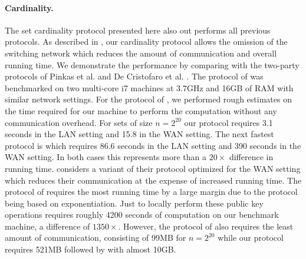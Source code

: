 \paragraph{Cardinality. } The set cardinality protocol presented here also out performs all previous protocols. As described in , our cardinality protocol allows the omission of the switching network which reduces the amount of communication and overall running time. We demonstrate the performance by comparing with the two-party protocols of Pinkas et al. \cite{PSWW18} and De Cristofaro et al. \cite{DBLP:conf/cans/CristofaroGT12}. The protocol of  \cite{PSWW18} was benchmarked on two multi-core i7 machines at 3.7GHz and 16GB of RAM with similar network settings. For the protocol of \cite{DBLP:conf/cans/CristofaroGT12}, we performed rough estimates on the time required for our machine to perform the computation without any communication overhead. For sets of size $n=2^{20}$ our protocol requires 3.1 seconds in the LAN setting and 15.8 in the WAN setting. The next fastest protocol is \cite{PSWW18} which requires 86.6 seconds in the LAN setting and 390 seconds in the WAN setting. In both cases this represents more than a $20\times$ difference in running time.  \cite{PSWW18} considers a variant of their protocol optimized for the WAN setting which reduces their communication at the expense of increased running time. The protocol of \cite{DBLP:conf/cans/CristofaroGT12} requires the most running time by a large margin due to the protocol being based on exponentiation. Just to locally perform these public key operations requires roughly 4200 seconds of computation on our benchmark machine, a difference of $1350\times$. However, the protocol of \cite{DBLP:conf/cans/CristofaroGT12} also requires the least amount of communication, consisting of 99MB for $n=2^{20}$ while our protocol requires 521MB followed by \cite{PSWW18}  with almost 10GB.



